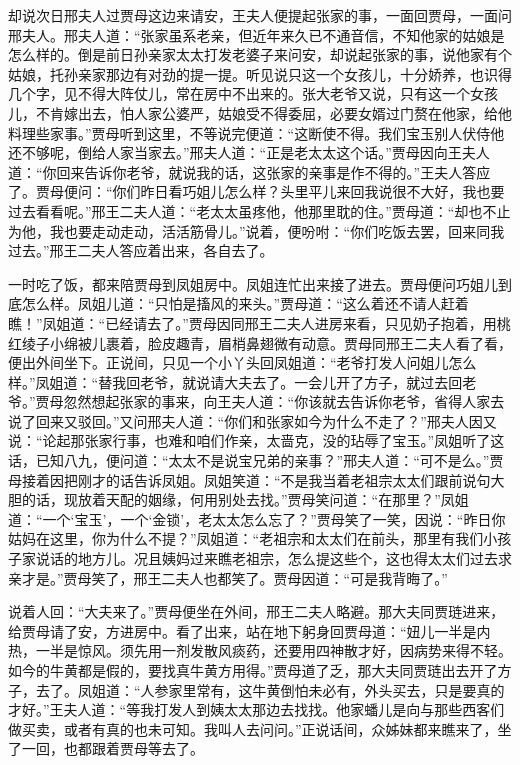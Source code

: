 \begin{parag}
    却说次日邢夫人过贾母这边来请安，王夫人便提起张家的事，一面回贾母，一面问邢夫人。邢夫人道：“张家虽系老亲，但近年来久已不通音信，不知他家的姑娘是怎么样的。倒是前日孙亲家太太打发老婆子来问安，却说起张家的事，说他家有个姑娘，托孙亲家那边有对劲的提一提。听见说只这一个女孩儿，十分娇养，也识得几个字，见不得大阵仗儿，常在房中不出来的。张大老爷又说，只有这一个女孩儿，不肯嫁出去，怕人家公婆严，姑娘受不得委屈，必要女婿过门赘在他家，给他料理些家事。”贾母听到这里，不等说完便道：“这断使不得。我们宝玉别人伏侍他还不够呢，倒给人家当家去。”邢夫人道：“正是老太太这个话。”贾母因向王夫人道：“你回来告诉你老爷，就说我的话，这张家的亲事是作不得的。”王夫人答应了。贾母便问：“你们昨日看巧姐儿怎么样？头里平儿来回我说很不大好，我也要过去看看呢。”邢王二夫人道：“老太太虽疼他，他那里耽的住。”贾母道：“却也不止为他，我也要走动走动，活活筋骨儿。”说着，便吩咐：“你们吃饭去罢，回来同我过去。”邢王二夫人答应着出来，各自去了。
\end{parag}


\begin{parag}
    一时吃了饭，都来陪贾母到凤姐房中。凤姐连忙出来接了进去。贾母便问巧姐儿到底怎么样。凤姐儿道：“只怕是搐风的来头。”贾母道：“这么着还不请人赶着瞧！”凤姐道：“已经请去了。”贾母因同邢王二夫人进房来看，只见奶子抱着，用桃红绫子小绵被儿裹着，脸皮趣青，眉梢鼻翅微有动意。贾母同邢王二夫人看了看，便出外间坐下。正说间，只见一个小丫头回凤姐道：“老爷打发人问姐儿怎么样。”凤姐道：“替我回老爷，就说请大夫去了。一会儿开了方子，就过去回老爷。”贾母忽然想起张家的事来，向王夫人道：“你该就去告诉你老爷，省得人家去说了回来又驳回。”又问邢夫人道：“你们和张家如今为什么不走了？”邢夫人因又说：“论起那张家行事，也难和咱们作亲，太啬克，没的玷辱了宝玉。”凤姐听了这话，已知八九，便问道：“太太不是说宝兄弟的亲事？”邢夫人道：“可不是么。”贾母接着因把刚才的话告诉凤姐。凤姐笑道：“不是我当着老祖宗太太们跟前说句大胆的话，现放着天配的姻缘，何用别处去找。”贾母笑问道：“在那里？”凤姐道：“一个‘宝玉’，一个‘金锁’，老太太怎么忘了？”贾母笑了一笑，因说：“昨日你姑妈在这里，你为什么不提？”凤姐道：“老祖宗和太太们在前头，那里有我们小孩子家说话的地方儿。况且姨妈过来瞧老祖宗，怎么提这些个，这也得太太们过去求亲才是。”贾母笑了，邢王二夫人也都笑了。贾母因道：“可是我背晦了。”
\end{parag}


\begin{parag}
    说着人回：“大夫来了。”贾母便坐在外间，邢王二夫人略避。那大夫同贾琏进来，给贾母请了安，方进房中。看了出来，站在地下躬身回贾母道：“妞儿一半是内热，一半是惊风。须先用一剂发散风痰药，还要用四神散才好，因病势来得不轻。如今的牛黄都是假的，要找真牛黄方用得。”贾母道了乏，那大夫同贾琏出去开了方子，去了。凤姐道：“人参家里常有，这牛黄倒怕未必有，外头买去，只是要真的才好。”王夫人道：“等我打发人到姨太太那边去找找。他家蟠儿是向与那些西客们做买卖，或者有真的也未可知。我叫人去问问。”正说话间，众姊妹都来瞧来了，坐了一回，也都跟着贾母等去了。
\end{parag}


